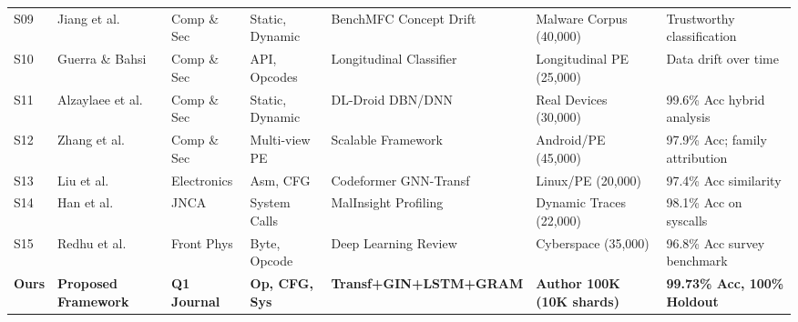 \documentclass[pdflatex,sn-mathphys-num]{sn-jnl}
\begin{document}
\begin{tableorg}[t]
{\begin{tabular}{lllllll}
S09 & Jiang et al. \cite{Jiang2024BenchMFC} & Comp \& Sec & Static, Dynamic & BenchMFC Concept Drift & Malware Corpus (40,000) & Trustworthy classification \\
S10 & Guerra \& Bahsi \cite{Guerra2022} & Comp \& Sec & API, Opcodes & Longitudinal Classifier & Longitudinal PE (25,000) & Data drift over time \\
S11 & Alzaylaee et al. \cite{Alzaylaee2020} & Comp \& Sec & Static, Dynamic & DL-Droid DBN/DNN & Real Devices (30,000) & 99.6\% Acc hybrid analysis \\
S12 & Zhang et al. \cite{Zhang2019} & Comp \& Sec & Multi-view PE & Scalable Framework & Android/PE (45,000) & 97.9\% Acc; family attribution \\
S13 & Liu et al. \cite{Codeformer2023} & Electronics & Asm, CFG & Codeformer GNN-Transf & Linux/PE (20,000) & 97.4\% Acc similarity \\
S14 & Han et al. \cite{MalInsight2019} & JNCA & System Calls & MalInsight Profiling & Dynamic Traces (22,000) & 98.1\% Acc on syscalls \\
S15 & Redhu et al. \cite{Redhu2024} & Front Phys & Byte, Opcode & Deep Learning Review & Cyberspace (35,000) & 96.8\% Acc survey benchmark \\
\midrule
\textbf{Ours} & \textbf{Proposed Framework} & \textbf{Q1 Journal} & \textbf{Op, CFG, Sys} & \textbf{Transf+GIN+LSTM+GRAM} & \textbf{Author 100K (10K shards)} & \textbf{99.73\% Acc, 100\% Holdout} \\
\bottomrule
\end{tabular}%
}
\end{tableorg}
\end{document}
